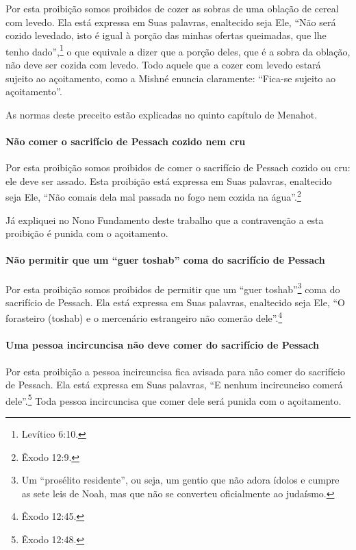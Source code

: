 Por esta proibição somos proibidos de cozer as sobras de uma oblação de
cereal com levedo. Ela está expressa em Suas palavras, enaltecido seja
Ele, ``Não será cozido levedado, isto é igual à porção das minhas
ofertas queimadas, que lhe tenho dado'',\footnote{Levítico 6:10.} o que equivale
a dizer que a porção deles, que é a sobra da oblação, não deve ser
cozida com levedo. Todo aquele que a cozer com levedo estará sujeito ao
açoitamento, como a Mishné enuncia claramente: ``Fica-se sujeito ao
açoitamento''.

As normas deste preceito estão explicadas no quinto capítulo de Menahot.

\paragraph{Não comer o sacrifício de Pessach cozido nem cru}

Por esta proibição somos proibidos de comer o sacrifício de Pessach
cozido ou cru: ele deve ser assado. Esta proibição está expressa em Suas
palavras, enaltecido seja Ele, ``Não comais dela mal passada no fogo nem
cozida na água''.\footnote{Êxodo 12:9.}

Já expliquei no Nono Fundamento deste trabalho que a contravenção a
esta proibição é punida com o açoitamento.

\paragraph{Não permitir que um ``guer toshab'' coma do sacrifício de Pessach}

Por esta proibição somos proibidos de permitir que um ``guer
toshab''\footnote{Um ``prosélito residente'', ou seja, um gentio que não adora
ídolos e cumpre as sete leis de Noah, mas que não se converteu
oficialmente ao judaísmo.} coma do sacrifício de Pessach. Ela
está expressa em Suas palavras, enaltecido seja Ele, ``O forasteiro
(toshab) e o mercenário estrangeiro não comerão dele''.\footnote{Êxodo 12:45.}

\paragraph{Uma pessoa incircuncisa não deve comer do sacrifício de Pessach}

Por esta proibição a pessoa incircuncisa fica avisada para não comer do
sacrifício de Pessach. Ela está expressa em Suas palavras, ``E nenhum
incircunciso comerá dele''.\footnote{Êxodo 12:48.} Toda pessoa incircuncisa que
comer dele será punida com o açoitamento.

